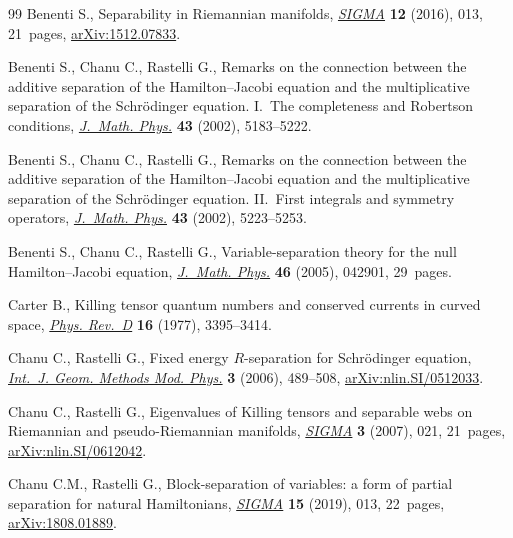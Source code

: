 \documentclass[11pt]{article}
\numberwithin{equation}{section}
\begin{document}
\begin{thebibliography}{99}
Benenti S., Separability in {R}iemannian manifolds, \href{https://doi.org/10.3842/SIGMA.2016.013}{\textit{SIGMA}} \textbf{12}
 (2016), 013, 21~pages, \href{https://arxiv.org/abs/1512.07833}{arXiv:1512.07833}.

Benenti S., Chanu C., Rastelli G., Remarks on the connection between the
 additive separation of the {H}amilton--{J}acobi equation and the
 multiplicative separation of the {S}chr\"{o}dinger equation. {I}.~{T}he
 completeness and {R}obertson conditions, \href{https://doi.org/10.1063/1.1506180}{\textit{J.~Math. Phys.}} \textbf{43}
 (2002), 5183--5222.

Benenti S., Chanu C., Rastelli G., Remarks on the connection between the
 additive separation of the {H}amilton--{J}acobi equation and the
 multiplicative separation of the {S}chr\"{o}dinger equation. {II}.~{F}irst
 integrals and symmetry operators, \href{https://doi.org/10.1063/1.1506181}{\textit{J.~Math. Phys.}} \textbf{43} (2002),
 5223--5253.

Benenti S., Chanu C., Rastelli G., Variable-separation theory for the null
 {H}amilton--{J}acobi equation, \href{https://doi.org/10.1063/1.1862325}{\textit{J.~Math. Phys.}} \textbf{46} (2005),
 042901, 29~pages.

Carter B., Killing tensor quantum numbers and conserved currents in curved
 space, \href{https://doi.org/10.1103/PhysRevD.16.3395}{\textit{Phys. Rev.~D}} \textbf{16} (1977), 3395--3414.

Chanu C., Rastelli G., Fixed energy {$R$}-separation for {S}chr\"{o}dinger
 equation, \href{https://doi.org/10.1142/S021988780600120X}{\textit{Int.~J. Geom. Methods Mod. Phys.}} \textbf{3} (2006),
 489--508, \href{https://arxiv.org/abs/nlin.SI/0512033}{arXiv:nlin.SI/0512033}.

Chanu C., Rastelli G., Eigenvalues of {K}illing tensors and separable webs on
 {R}iemannian and pseudo-{R}iemannian manifolds, \href{https://doi.org/10.3842/SIGMA.2007.021}{\textit{SIGMA}} \textbf{3}
 (2007), 021, 21~pages, \href{https://arxiv.org/abs/nlin.SI/0612042}{arXiv:nlin.SI/0612042}.

Chanu C.M., Rastelli G., Block-separation of variables: a form of partial
 separation for natural {H}amiltonians, \href{https://doi.org/10.3842/SIGMA.2019.013}{\textit{SIGMA}} \textbf{15} (2019),
 013, 22~pages, \href{https://arxiv.org/abs/1808.01889}{arXiv:1808.01889}.


\end{thebibliography}
\end{document}
